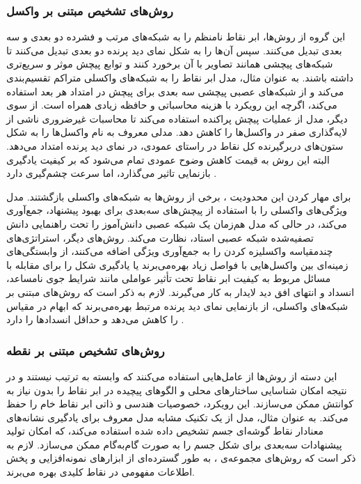 \subsubsection{روش‌های تشخیص مبتنی بر واکسل}

این گروه از روش‌ها، ابر نقاط نامنظم را به شبکه‌های مرتب و فشرده دو بعدی و سه بعدی تبدیل می‌کنند. سپس آن‌ها را به شکل نمای دید پرنده دو بعدی تبدیل می‌کنند تا شبکه‌های پیچشی همانند تصاویر با آن برخورد کنند و توابع پیچش موثر و سریع‌تری داشته باشند. به عنوان مثال، مدل  ابر نقاط را به شبکه‌های واکسلی متراکم تقسیم‌بندی می‌کند و از شبکه‌های عصبی پیچشی سه بعدی برای پیچش در امتداد هر بعد استفاده می‌کند، اگرچه این رویکرد با هزینه محاسباتی و حافظه زیادی همراه است. از سوی دیگر، مدل  از عملیات پیچش پراکنده استفاده می‌کند تا محاسبات غیرضروری ناشی از لایه‌گذاری صفر در واکسل‌ها را کاهش دهد. مدلی معروف به نام  واکسل‌ها را به شکل ستون‌های دربرگیرنده کل نقاط در راستای عمودی، در نمای دید پرنده امتداد می‌دهد. البته این روش به قیمت کاهش وضوح عمودی تمام می‌شود که بر کیفیت یادگیری بازنمایی تاثیر می‌گذارد، اما سرعت چشم‌گیری دارد \cite{qian20223d}.

برای مهار کردن این محدودیت ، برخی از روش‌ها به شبکه‌های واکسلی باز‌گشتند. مدل  ویژگی‌های واکسلی را با استفاده از پیچش‌های سه‌بعدی برای بهبود پیشنهاد، جمع‌آوری می‌کند، در حالی که مدل  هم‌زمان یک شبکه عصبی دانش‌آموز را تحت راهنمایی دانش تصفیه‌شده شبکه عصبی استاد، نظارت می‌کند. روش‌های دیگر، استراتژی‌های چندمقیاسه واکسلیزه کردن را به جمع‌آوری ویژگی اضافه می‌کنند، از وابستگی‌های زمینه‌ای بین واکسل‌هایی با فواصل زیاد بهره‌می‌برند یا یادگیری شکل را برای مقابله با مسائل مربوط به کیفیت ابر نقاط تحت تأثیر عواملی مانند شرایط جوی نامساعد، انسداد و انتهای افق دید لایدار به کار می‌گیرند. لازم به ذکر است که روش‌های مبتنی بر شبکه‌های واکسلی، از بازنمایی نمای دید پرنده مرتبط بهره‌می‌برند که ابهام در مقیاس را کاهش می‌دهد و حداقل انسدادها را دارد \cite{qian20223d}.

\subsubsection{روش‌های تشخیص مبتنی بر نقطه}
این دسته از روش‌ها از عامل‌هایی استفاده می‌کنند که وابسته به ترتیب نیستند و در نتیجه امکان شناسایی ساختارهای محلی و الگوهای پیچیده در ابر نقاط را بدون نیاز به کوانتش ممکن می‌سازند. این رویکرد، خصوصیات هندسی و ذاتی ابر نقاط خام را حفظ می‌کند. به عنوان مثال، مدل  از یک تکنیک مشابه مدل معروف  برای یادگیری نشانه‌های معنادار نقاط گوشه‌ای جسم تشخیص داده شده استفاده می‌کند، که امکان تولید پیشنهادات سه‌بعدی برای شکل جسم را به صورت گام‌به‌گام ممکن می‌سازد. لازم به ذکر است که روش‌های مجموعه‌ی ، به طور گسترده‌ای از ابزارهای نمونه‌افزایی و پخش اطلاعات مفهومی در نقاط کلیدی بهره می‌برند.

